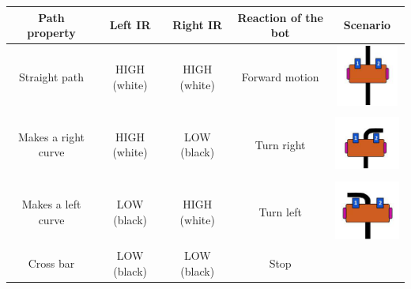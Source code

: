 \renewcommand{\arraystretch}{3.6}
\begin{table}
    \centering
    \begin{tabular}{|c|c|c|c|c|}
    \hline
        \textbf{Path property} & \textbf{Left IR} & \textbf{Right IR} & \textbf{Reaction of the bot} & \textbf{Scenario} \\ \hline
        Straight path & HIGH (white) & HIGH (white) & Forward motion & \begin{minipage}{.3\textwidth}
            \centering
            \includegraphics[width=\linewidth, height=20mm]{Images/IR Sensor/IR_linefollower_straight.png}
            \vspace{1mm}
        \end{minipage} \\ \hline
        Makes a right curve & HIGH (white) & LOW (black) & Turn right & \begin{minipage}{.3\textwidth}
            \centering
            \includegraphics[width=\linewidth, height=20mm]{Images/IR Sensor/IR_linefollower_right.png}
            \vspace{1mm}
        \end{minipage}  \\ \hline
        Makes a left curve & LOW (black) & HIGH (white) & Turn left & \begin{minipage}{.3\textwidth}
            \centering
            \includegraphics[width=\linewidth, height=20mm]{Images/IR Sensor/IR_linefollower_left.png}
            \vspace{1mm}
        \end{minipage}  \\ \hline
        Cross bar & LOW (black) & LOW (black) & Stop & \begin{minipage}{.3\textwidth}
            \centering

\end{minipage}
\end{tabular}
\end{table}
